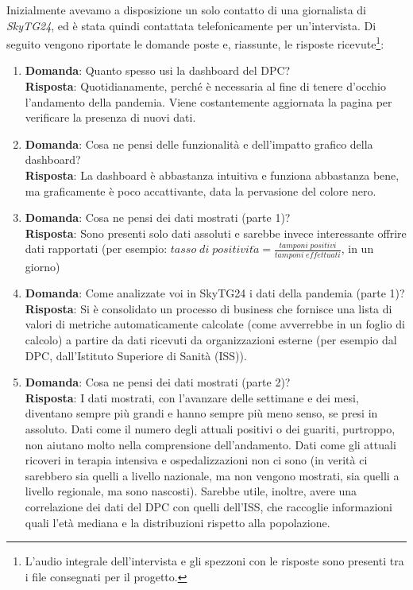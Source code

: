 Inizialmente avevamo a disposizione un solo contatto di una giornalista di \textit{SkyTG24}, ed è stata quindi contattata telefonicamente per un'intervista.
Di seguito vengono riportate le domande poste e, riassunte, le risposte ricevute\footnote{L'audio integrale dell'intervista e gli spezzoni con le risposte sono presenti tra i file consegnati per il progetto.}:
\begin{enumerate}
    \item \textbf{Domanda}: Quanto spesso usi la dashboard del DPC?\\\textbf{Risposta}: Quotidianamente, perché è necessaria al fine di tenere d'occhio l'andamento della pandemia. Viene costantemente aggiornata la pagina per verificare la presenza di nuovi dati.
    \item \textbf{Domanda}: Cosa ne pensi delle funzionalità e dell’impatto grafico della dashboard?\\\textbf{Risposta}: La dashboard è abbastanza intuitiva e funziona abbastanza bene, ma graficamente è poco accattivante, data la pervasione del colore nero.
    \item \textbf{Domanda}: Cosa ne pensi dei dati mostrati (parte 1)?\\\textbf{Risposta}: Sono presenti solo dati assoluti e sarebbe invece interessante offrire dati rapportati (per esempio: $tasso\; di\; positivit\grave{a} = \frac{tamponi\; positivi}{tamponi\; effettuati}$, in un giorno)
    \item \textbf{Domanda}: Come analizzate voi in SkyTG24 i dati della pandemia (parte 1)?\\\textbf{Risposta}: Si è consolidato un processo di business che fornisce una lista di valori di metriche automaticamente calcolate (come avverrebbe in un foglio di calcolo) a partire da dati ricevuti da organizzazioni esterne (per esempio dal DPC, dall'Istituto Superiore di Sanità (ISS)).
    \item \textbf{Domanda}: Cosa ne pensi dei dati mostrati (parte 2)?\\\textbf{Risposta}: I dati mostrati, con l'avanzare delle settimane e dei mesi, diventano sempre più grandi e hanno sempre più meno senso, se presi in assoluto. Dati come il numero degli attuali positivi o dei guariti, purtroppo, non aiutano molto nella comprensione dell'andamento. Dati come gli attuali ricoveri in terapia intensiva e ospedalizzazioni non ci sono (in verità ci sarebbero sia quelli a livello nazionale, ma non vengono mostrati, sia quelli a livello regionale, ma sono nascosti). Sarebbe utile, inoltre, avere una correlazione dei dati del DPC con quelli dell'ISS, che raccoglie informazioni quali l'età mediana e la distribuzioni rispetto alla popolazione.

\end{enumerate}
